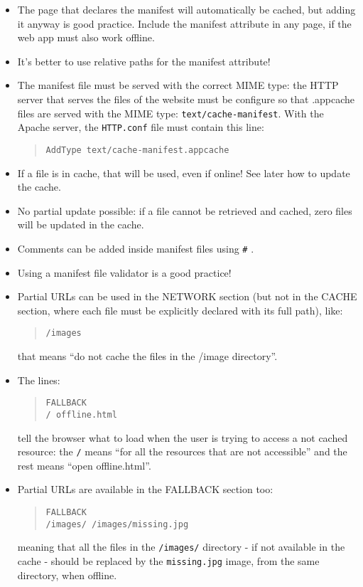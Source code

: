 \documentclass[a4paper,11pt]{book}
\begin{document}
\begin{itemize}
\item The page that declares the manifest will automatically be cached, but adding it anyway is
good practice. Include the manifest
attribute in any page, if the web app must also work offline.
\item It's better to use relative paths for the manifest attribute!
\item The manifest file must be served with the correct MIME type: the HTTP server that
serves the files of the website must be configure so that .appcache files are served with
the MIME type: \texttt{text/cache-manifest}. With the Apache server, the \texttt{HTTP.conf} file
must contain this line:
\begin{verse}
\texttt{AddType text/cache-manifest.appcache}
\end{verse}
\item If a file is in cache, that will be used, even if online! See later how to update the cache.
\item No partial update possible: if a file cannot be retrieved and cached, zero files will be
updated in the cache.
\item Comments can be added inside manifest files using \texttt{\#} .
\item Using a manifest file validator is a good practice!
\item Partial URLs can be used in the NETWORK section (but not in the CACHE section, where each
file must be explicitly declared with its full path), like:
	\begin{verse}
	\texttt{/images}
	\end{verse}
	that means ``do not cache the files in the /image directory''.
\item The lines:
	\begin{verse}
	\texttt{FALLBACK} \\ \texttt{/ offline.html}
	\end{verse}
	tell the browser what to load when the user is trying to access a not cached resource:
	the \texttt{/} means ``for all the resources that are not accessible'' and the rest means
	``open offline.html''.
\item Partial URLs are available in the FALLBACK section too:
	\begin{verse}
	\texttt{FALLBACK} \\
	\texttt{/images/ /images/missing.jpg}
	\end{verse}
	meaning that all the files in the \texttt{/images/} directory - if not available in the cache -
	should be replaced by the \texttt{missing.jpg}
	image, from the same directory, when offline.
\end{itemize}
\end{document}
